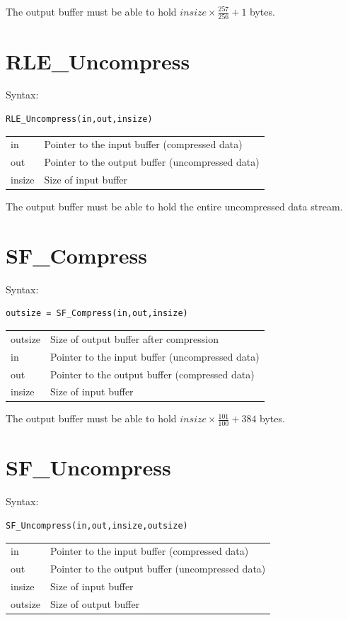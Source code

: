 \documentclass[a4paper,11pt,oneside]{report}
\begin{document}
The output buffer must be able to hold $insize\times\frac{257}{256}+1$ bytes.


\section{RLE\_Uncompress}
Syntax:
\begin{lstlisting}
RLE_Uncompress(in,out,insize)
\end{lstlisting}

\begin{tabular}{ll}
in      & Pointer to the input buffer (compressed data)\\
out     & Pointer to the output buffer (uncompressed data)\\
insize  & Size of input buffer
\end{tabular}

The output buffer must be able to hold the entire uncompressed data
stream.


\section{SF\_Compress}
Syntax:
\begin{lstlisting}
outsize = SF_Compress(in,out,insize)
\end{lstlisting}

\begin{tabular}{ll}
outsize & Size of output buffer after compression\\
in      & Pointer to the input buffer (uncompressed data)\\
out     & Pointer to the output buffer (compressed data)\\
insize  & Size of input buffer
\end{tabular}

The output buffer must be able to hold $insize\times\frac{101}{100}+384$ bytes.


\section{SF\_Uncompress}
Syntax:
\begin{lstlisting}
SF_Uncompress(in,out,insize,outsize)
\end{lstlisting}

\begin{tabular}{ll}
in      & Pointer to the input buffer (compressed data)\\
out     & Pointer to the output buffer (uncompressed data)\\
insize  & Size of input buffer\\
outsize & Size of output buffer
\end{tabular}
\end{document}
